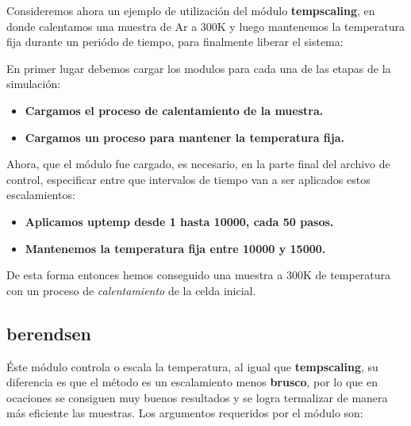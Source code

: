 Consideremos ahora un ejemplo de utilizaci\'on del m\'odulo \textbf{tempscaling}, en donde calentamos una muestra de Ar a 300K y luego mantenemos la temperatura fija durante un peri\'odo de tiempo, para finalmente liberar el sistema:

En primer lugar debemos cargar los modulos para cada una de las etapas de la simulaci\'on:

\begin{itemize}
 \item \textbf{Cargamos el proceso de calentamiento de la muestra.}
 \item \textbf{Cargamos un proceso para mantener la temperatura fija.}
\end{itemize}

Ahora, que el m\'odulo fue cargado, es necesario, en la parte final del archivo de control, especificar entre que intervalos de tiempo van a ser aplicados estos escalamientos:

\begin{itemize}
 \item \textbf{Aplicamos \textbf{uptemp} desde 1 hasta 10000, cada 50 pasos.}
 \item \textbf{Mantenemos la temperatura fija entre 10000 y 15000.}
\end{itemize}

De esta forma entonces hemos conseguido una muestra a 300K de temperatura con un proceso de \textit{calentamiento} de la celda inicial.

\subsection{berendsen}
\'Este m\'odulo controla o escala la temperatura, al igual que \textbf{tempscaling}, su diferencia es que el m\'etodo es un escalamiento menos \textbf{brusco}, por lo que en ocaciones se consiguen muy buenos resultados y se logra termalizar de manera m\'as eficiente las muestras. Los argumentos requeridos por el m\'odulo son:

